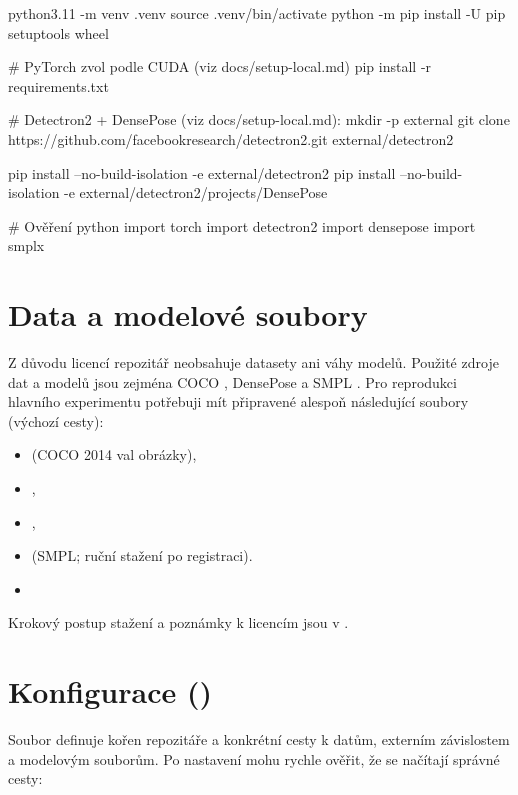 \documentclass[11pt,a4paper,twoside,openright]{report}
\begin{document}
\begin{codeblock}
python3.11 -m venv .venv
source .venv/bin/activate
python -m pip install -U pip setuptools wheel

# PyTorch zvol podle CUDA (viz docs/setup-local.md)
pip install -r requirements.txt

# Detectron2 + DensePose (viz docs/setup-local.md):
mkdir -p external
git clone https://github.com/facebookresearch/detectron2.git external/detectron2

pip install --no-build-isolation -e external/detectron2
pip install --no-build-isolation -e external/detectron2/projects/DensePose

# Ověření
python
import torch
import detectron2
import densepose
import smplx

\end{codeblock}

\section{Data a modelové soubory}

Z důvodu licencí repozitář neobsahuje datasety ani váhy modelů. Použité zdroje dat a modelů jsou zejména COCO \cite{lin2014microsoft}, DensePose \cite{guler2018densepose} a SMPL \cite{SMPL:2015,smpl_website}. Pro reprodukci hlavního experimentu potřebuji mít připravené alespoň následující soubory (výchozí cesty):

\begin{itemize}
    \item {} (COCO 2014 val obrázky),
    \item {},
    \item {},
    \item {} (SMPL; ruční stažení po registraci).
    \item {}
\end{itemize}

Krokový postup stažení a poznámky k licencím jsou v .

\section{Konfigurace ()}

Soubor  definuje kořen repozitáře a konkrétní cesty k datům, externím závislostem a modelovým souborům. Po nastavení mohu rychle ověřit, že se načítají správné cesty:
\end{document}
